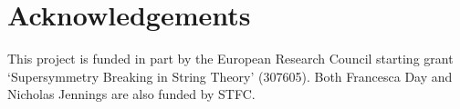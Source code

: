 \documentclass[fleqn,usenatbib,useAMS]{mnras}
\begin{document}
\section*{Acknowledgements}

This project is funded in part by the European Research Council starting grant `Supersymmetry Breaking in String Theory' (307605). Both Francesca Day and Nicholas Jennings are also funded by STFC.\\
\bsp



\label{lastpage}
\end{document}
